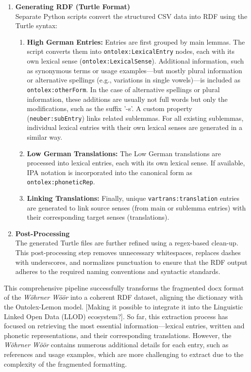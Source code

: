 \documentclass[11pt]{article}
\begin{document}
\begin{enumerate}
    \item {\textbf{Generating RDF (Turtle Format)}}\\ 
    Separate Python scripts convert the structured CSV data into RDF using the Turtle syntax:
    \begin{enumerate}
        \item {\textbf{High German Entries:}} Entries are first grouped by main lemmas. The script converts them into \texttt{ontolex:LexicalEntry} nodes, each with its own lexical sense (\texttt{ontolex:LexicalSense}). Additional information, such as synonymous terms or usage examples—but mostly plural information or alternative spellings (e.g., variations in single vowels)—is included as \texttt{ontolex:otherForm}. In the case of alternative spellings or plural information, these additions are usually not full words but only the modifications, such as the suffix '-s'. A custom property (\texttt{neuber:subEntry}) links related sublemmas. For all existing sublemmas, individual lexical entries with their own lexical senses are generated in a similar way.
        \item {\textbf{Low German Translations:}} The Low German translations are processed into lexical entries, each with its own lexical sense. If available, IPA notation is incorporated into the canonical form as \texttt{ontolex:phoneticRep}.
        \item {\textbf{Linking Translations:}} Finally, unique \texttt{vartrans:translation} entries are generated to link source senses (from main or sublemma entries) with their corresponding target senses (translations).
    \end{enumerate}

    \item {\textbf{Post-Processing}}\\  
    The generated Turtle files are further refined using a regex-based clean-up. This post-processing step removes unnecessary whitespaces, replaces dashes with underscores, and normalizes punctuation to ensure that the RDF output adheres to the required naming conventions and syntactic standards.
\end{enumerate}

This comprehensive pipeline successfully transforms the fragmented docx format of the \emph{Wöhrner Wöör} into a coherent RDF dataset, aligning the dictionary with the Ontolex-Lemon model. [Making it possible to integrate it into the Linguistic Linked Open Data (LLOD) ecosystem?]. So far, this extraction process has focused on retrieving the most essential information—lexical entries, written and phonetic representations, and their corresponding translations. However, the \emph{Wöhrner Wöör} contains numerous additional details for each entry, such as references and usage examples, which are more challenging to extract due to the complexity of the fragmented formatting.
\end{document}
